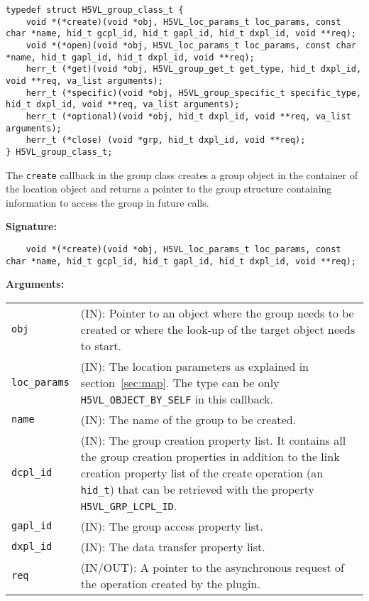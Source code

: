 \begin{lstlisting}[caption={Structure for group callback routines, H5VLpublic.h}, captionpos=b, label={lst:Groupclass}]
typedef struct H5VL_group_class_t {
    void *(*create)(void *obj, H5VL_loc_params_t loc_params, const char *name, hid_t gcpl_id, hid_t gapl_id, hid_t dxpl_id, void **req);
    void *(*open)(void *obj, H5VL_loc_params_t loc_params, const char *name, hid_t gapl_id, hid_t dxpl_id, void **req);
    herr_t (*get)(void *obj, H5VL_group_get_t get_type, hid_t dxpl_id, void **req, va_list arguments);
    herr_t (*specific)(void *obj, H5VL_group_specific_t specific_type, hid_t dxpl_id, void **req, va_list arguments);
    herr_t (*optional)(void *obj, hid_t dxpl_id, void **req, va_list arguments);
    herr_t (*close) (void *grp, hid_t dxpl_id, void **req);
} H5VL_group_class_t;
\end{lstlisting}

The \texttt{create} callback in the group class creates a group
object in the container of the location object and returns a pointer
to the group structure containing information to access the group in
future calls.\bigskip

\begin{mdframed}[style=bgbox]
\textbf{Signature:}
\begin{lstlisting}
    void *(*create)(void *obj, H5VL_loc_params_t loc_params, const char *name, hid_t gcpl_id, hid_t gapl_id, hid_t dxpl_id, void **req);
\end{lstlisting}

\textbf{Arguments:}\\
\begin{tabular}{l p{10cm}}
  \texttt{obj} & (IN): Pointer to an object where the group needs
  to be created or where the look-up of the target object needs to
  start.\\
  \texttt{loc\_params} & (IN): The location parameters as explained in
  section~\ref{sec:map}. The type can be only \texttt{H5VL\_OBJECT\_BY\_SELF} in this callback. \\
  \texttt{name} & (IN): The name of the group to be created.\\
  \texttt{dcpl\_id} & (IN): The group creation property list. It contains
  all the group creation properties in addition to the link creation
  property list of the create operation (an \texttt{hid\_t}) that can be
  retrieved with the property \texttt{H5VL\_GRP\_LCPL\_ID}.\\
  \texttt{gapl\_id} & (IN): The group access property list.\\
  \texttt{dxpl\_id} & (IN): The data transfer property list.\\
  \texttt{req} & (IN/OUT): A pointer to the asynchronous request of the
  operation created by the plugin.\\
\end{tabular}
\end{mdframed}

